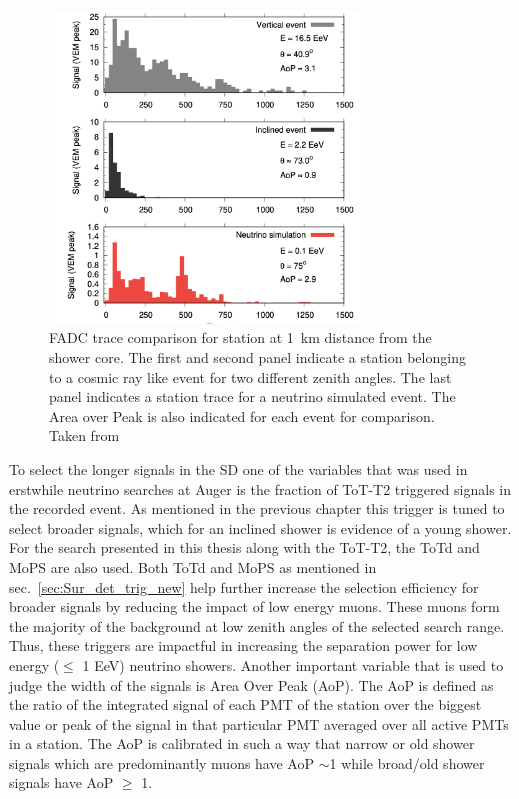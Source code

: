 \begin{figure}[t!]
  \centering
  \includegraphics[width=0.75\textwidth]{thesis_figures/Nu_analysis/Signal_trace_comp.png}
  \caption{FADC trace comparison for station at 1~km distance from the shower core. The first and second panel indicate a station belonging to a cosmic ray like event for two different zenith angles. The last panel indicates a station trace for a neutrino simulated event. The Area over Peak is also indicated for each event for comparison. Taken from~\cite{Aab_2019_diffuse}}
  \label{fig:Signal_trace_comp}
\end{figure}

To select the longer signals in the SD one of the variables that was used in erstwhile neutrino searches at Auger is the fraction of ToT-T2 triggered signals in the recorded event. As mentioned in the previous chapter this trigger is tuned to select broader signals, which for an inclined shower is evidence of a young shower. For the search presented in this thesis along with the ToT-T2, the ToTd and MoPS are also used. Both ToTd and MoPS as mentioned in sec.~\ref{sec:Sur_det_trig_new} help further increase the selection efficiency for broader signals by reducing the impact of low energy muons. These muons form the majority of the background at low zenith angles of the selected search range. Thus, these triggers are impactful in increasing the separation power for low energy ($\leq$ 1 EeV) neutrino showers. Another important variable that is used to judge the width of the signals is Area Over Peak (AoP). The AoP is defined as the ratio of the integrated signal of each PMT of the station over the biggest value or peak of the signal in that particular PMT averaged over all active PMTs in a station. The AoP is calibrated in such a way that narrow or old shower signals which are predominantly muons have AoP $\sim$1 while broad/old shower signals have AoP $\geqslant$ 1. 

